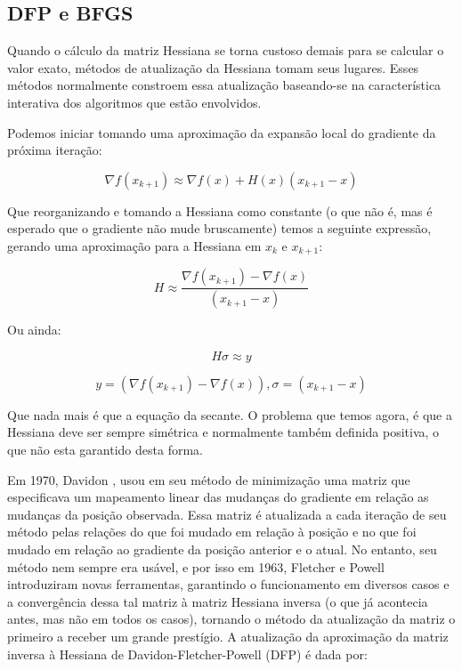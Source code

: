 \subsection{DFP e BFGS}
\label{sec_bfgs}

\noindent
Quando o cálculo da matriz Hessiana se torna custoso demais para se calcular o valor exato,
métodos de atualização da Hessiana tomam seus lugares. Esses métodos normalmente constroem
essa atualização baseando-se na característica interativa dos algoritmos que estão envolvidos.

Podemos iniciar tomando uma aproximação da expansão local do gradiente da próxima iteração:

\begin{equation}
\nabla f(x_{k+1}) \approx \nabla f(x) + H(x) (x_{k+1} - x)
\end{equation}

Que reorganizando e tomando a Hessiana como constante (o que não é, mas é esperado que o gradiente
não mude bruscamente) temos a seguinte expressão, gerando uma aproximação para a Hessiana em \(x_k\)
e \(x_{k+1}\):

\begin{equation}
H \approx \frac{\nabla f(x_{k+1}) - \nabla f(x)}{(x_{k+1} - x)}
\end{equation}

Ou ainda:

\begin{equation}
H\sigma \approx y
\end{equation}

\begin{equation}
y = (\nabla f(x_{k+1}) - \nabla f(x)), \sigma = (x_{k+1} - x)
\end{equation}


Que nada mais é que a equação da secante. O problema que temos agora, é que a Hessiana deve ser
sempre simétrica e normalmente também definida positiva, o que não esta garantido desta forma.

Em 1970, Davidon \cite{davidon1991variable}, usou em seu método de minimização uma matriz que
especificava um mapeamento linear das mudanças do gradiente em relação as mudanças da posição
observada. Essa matriz é atualizada a cada iteração de seu método pelas relações do que foi
mudado em relação à posição e no que foi mudado em relação ao gradiente da posição anterior
e o atual. No entanto, seu método nem sempre era usável, e por isso em 1963, Fletcher e Powell
\cite{fletcher1963rapidly} introduziram novas ferramentas, garantindo o funcionamento em diversos
casos e a convergência dessa tal matriz à matriz Hessiana inversa (o que já acontecia antes, mas
não em todos os casos), tornando o método da atualização da matriz o primeiro a receber um grande
prestígio. A atualização da aproximação da matriz inversa à Hessiana de Davidon-Fletcher-Powell
(DFP) é dada por:

